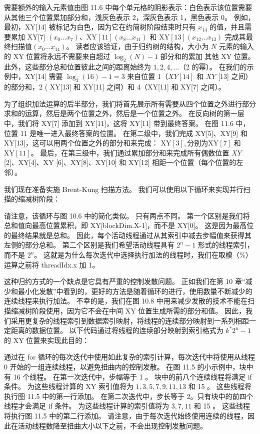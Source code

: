 需要额外的输入元素值由图 11.6 中每个单元格的阴影表示：白色表示该位置需要从其他三个位置累加部分和，浅灰色表示 2，深灰色表示 1，黑色表示 0。 例如，最初，XY[14] 被标记为白色，因为它在约简树阶段结束时只有 $x_{14}$ 的值，并且需要累加 XY[7] $\left(x_ {0} \ldots x_{7}\right)、\mathrm{XY}[11]\left(x_{8} \ldots x_{11}\right)$ 和 $\mathrm{XY}[13]\left(x_{12} \ldots x_{13}\right)$ 完成其最终扫描值$\left(x_{0} \ldots x_{14}\right)$。 读者应该验证，由于归约树的结构，大小为 $N$ 元素的输入的 XY 位置将永远不需要来自超过 $\log _{2}(N)-1$ 部分和的累加 其他 XY 位置。 此外，这些部分总和位置彼此之间的距离始终为 $1,2,4, \ldots$（2 的幂）。 在我们的示例中，XY[14] 需要 $\log _{2}(16)-1=3$ 来自位置 1（$X Y[14]$ 和 $X Y$ [13] 之间）的部分和，2 ( XY[13] 和 XY[11] 之间）和 4（XY[11] 和 XY[7] 之间）。

为了组织加法运算的后半部分，我们将首先展示所有需要从四个位置之外进行部分求和的运算，然后是两个位置之外，然后是一个位置之外。 在反向树的第一层中，我们将 XY[7] 添加到 XY[11]，这将 XY[11] 带到最终答案。 在图 11.6 中，位置 11 是唯一进入最终答案的位置。 在第二级中，我们完成 XY[5]、XY[9] 和 XY[13]，这可以用两个位置之外的部分和来完成： $\mathrm{XY}[3], \mathrm{ 分别为 XY}[7]$ 和 $\mathrm{XY}[11]$。 最后，在第三级中，我们通过累加部分和来完成所有偶数位置 $X Y$ [2]、XY[4]、XY [6]、XY[8]、XY[10] 和 XY[12] 相距一个位置（每个位置的左邻）。

我们现在准备实施 Brent-Kung 扫描方法。 我们可以使用以下循环来实现并行扫描的缩减树阶段：

请注意，该循环与图 10.6 中的简化类似。 只有两点不同。 第一个区别是我们将总和值向最高位置累积，即 XY[blockDim.X-1]，而不是 XY[0]。 这是因为最高位的最终结果就是总和。 因此，每个活动线程通过从其索引中减去步幅值来获得其左侧的部分总和。 第二个区别是我们希望活动线程具有 $2^{n}-1$ 形式的线程索引，而不是 $2^{n}$。 这就是为什么每次迭代中选择执行加法的线程时，我们在取模（\%）运算之前将 threadIdx.x 加 1。

这种归约方式的一个缺点是它具有严重的控制发散问题。 正如我们在第 10 章“减少和最小化发散”中看到的，更好的方法是随着循环的进行，使用数量不断减少的连续线程来执行加法。 不幸的是，我们在图 10.8 中用来减少发散的技术不能在扫描缩减树阶段使用，因为它不会在中间 $\mathrm{XY}$ 位置生成所需的部分和值。 因此，我们采用更复杂的线程索引到数据索引映射，将线程的连续部分映射到一系列相距一定距离的数据位置。 以下代码通过将线程的连续部分映射到索引格式为 $k^{*} 2^{n}-1$ 的 XY 位置来实现此目的：

通过在 for 循环的每次迭代中使用如此复杂的索引计算，每次迭代中将使用从线程 0 开始的一组连续线程，以避免扭曲内的控制发散。 在图 11.5 的小示例中，块中有 16 个线程。 在第一次迭代中，步幅等于 1 。 块中的前八个连续线程将满足 if 条件。 为这些线程计算的 XY 索引值将为 $1,3,5,7,9,11,13$ 和 15 。 这些线程将执行图 11.5 中的第一行添加。 在第二次迭代中，步长等于 2。只有块中的前四个线程才会满足 if 条件。 为这些线程计算的索引值将为 $3,7,11$ 和 15 。 这些线程将执行图 11.5 中的第二行添加。 请注意，由于每次迭代始终使用连续的线程，因此在活动线程数降至扭曲大小以下之前，不会出现控制发散问题。

